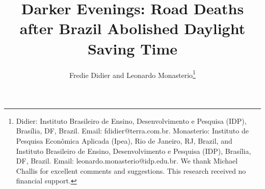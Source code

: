 \documentclass[AEJ,reviewmode]{AEA}
\begin{document}
\title{Darker Evenings: Road Deaths after Brazil Abolished Daylight Saving Time}
\author{Fredie Didier and Leonardo Monasterio\thanks{\raggedright Didier: Instituto Brasileiro de Ensino, Desenvolvimento e Pesquisa (IDP), Bras\'ilia, DF, Brazil. Email: fdidier@terra.com.br. Monasterio: Instituto de Pesquisa Econ\^omica Aplicada (Ipea), Rio de Janeiro, RJ, Brazil, and Instituto Brasileiro de Ensino, Desenvolvimento e Pesquisa (IDP), Bras\'ilia, DF, Brazil. Email: leonardo.monasterio@idp.edu.br. We thank Michael Challis for excellent comments and suggestions. This research received no financial support.}}
\date{}

\begin{abstract}

\end{abstract}

\maketitle
\end{document}
